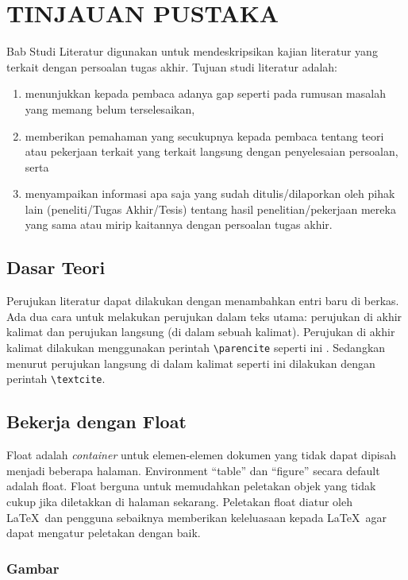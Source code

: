 \chapter{TINJAUAN PUSTAKA}

Bab Studi Literatur digunakan untuk mendeskripsikan kajian literatur yang terkait dengan persoalan tugas akhir. Tujuan studi literatur adalah:

\begin{enumerate}
    \item menunjukkan kepada pembaca adanya gap seperti pada rumusan masalah yang memang belum terselesaikan,
    \item memberikan pemahaman yang secukupnya kepada pembaca tentang teori atau pekerjaan terkait yang terkait langsung dengan penyelesaian persoalan, serta
    \item menyampaikan informasi apa saja yang sudah ditulis/dilaporkan oleh pihak lain (peneliti/Tugas Akhir/Tesis) tentang hasil penelitian/pekerjaan mereka yang sama atau mirip kaitannya dengan persoalan tugas akhir.
\end{enumerate}

\section{Dasar Teori}
Perujukan literatur dapat dilakukan dengan menambahkan entri baru di berkas. Ada dua cara untuk melakukan perujukan dalam teks utama: perujukan di akhir kalimat dan perujukan langsung (di dalam sebuah kalimat). Perujukan di akhir kalimat dilakukan menggunakan perintah \texttt{\textbackslash parencite} seperti ini \parencite{knuth2001art}. Sedangkan menurut \textcite{knuth2001art} perujukan langsung di dalam kalimat seperti ini dilakukan dengan perintah \texttt{\textbackslash textcite}.

\section{Bekerja dengan Float}

Float adalah \textit{container} untuk elemen-elemen dokumen yang tidak dapat dipisah menjadi beberapa halaman. Environment ``table'' dan ``figure'' secara default adalah float. Float berguna untuk memudahkan peletakan objek yang tidak cukup jika diletakkan di halaman sekarang. Peletakan float diatur oleh \LaTeX\ dan pengguna sebaiknya memberikan keleluasaan kepada \LaTeX\ agar dapat mengatur peletakan dengan baik. 

\subsection{Gambar}

